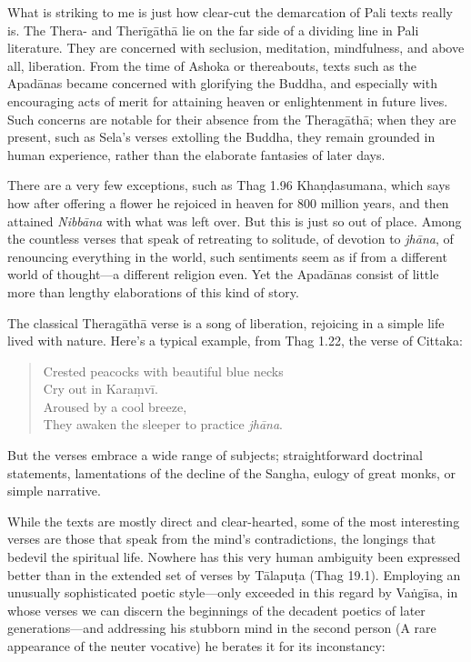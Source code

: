\documentclass[12pt,openany]{book}%
\begin{document}
What is striking to me is just how clear-cut the demarcation of Pali texts really is. The Thera- and \textsanskrit{Therīgāthā} lie on the far side of a dividing line in Pali literature. They are concerned with seclusion, meditation, mindfulness, and above all, liberation. From the time of Ashoka or thereabouts, texts such as the \textsanskrit{Apadānas} became concerned with glorifying the Buddha, and especially with encouraging acts of merit for attaining heaven or enlightenment in future lives. Such concerns are notable for their absence from the \textsanskrit{Theragāthā}; when they are present, such as Sela’s verses extolling the Buddha, they remain grounded in human experience, rather than the elaborate fantasies of later days.

There are a very few exceptions, such as Thag 1.96 \textsanskrit{Khaṇḍasumana}, which says how after offering a flower he rejoiced in heaven for 800 million years, and then attained \textit{\textsanskrit{Nibbāna}} with what was left over. But this is just so out of place. Among the countless verses that speak of retreating to solitude, of devotion to \textit{\textsanskrit{jhāna}}, of renouncing everything in the world, such sentiments seem as if from a different world of thought—a different religion even. Yet the \textsanskrit{Apadānas} consist of little more than lengthy elaborations of this kind of story.

The classical \textsanskrit{Theragāthā} verse is a song of liberation, rejoicing in a simple life lived with nature. Here’s a typical example, from Thag 1.22, the verse of Cittaka:

\begin{quotation}%
Crested peacocks with beautiful blue necks \\
Cry out in \textsanskrit{Karaṃvī}. \\
Aroused by a cool breeze, \\
They awaken the sleeper to practice \textit{\textsanskrit{jhāna}}.

%
\end{quotation}

But the verses embrace a wide range of subjects; straightforward doctrinal statements, lamentations of the decline of the Sangha, eulogy of great monks, or simple narrative.

While the texts are mostly direct and clear-hearted, some of the most interesting verses are those that speak from the mind’s contradictions, the longings that bedevil the spiritual life. Nowhere has this very human ambiguity been expressed better than in the extended set of verses by \textsanskrit{Tālapuṭa} (Thag 19.1). Employing an unusually sophisticated poetic style—only exceeded in this regard by \textsanskrit{Vaṅgīsa}, in whose verses we can discern the beginnings of the decadent poetics of later generations—and addressing his stubborn mind in the second person (A rare appearance of the neuter vocative) he berates it for its inconstancy:
\end{document}
